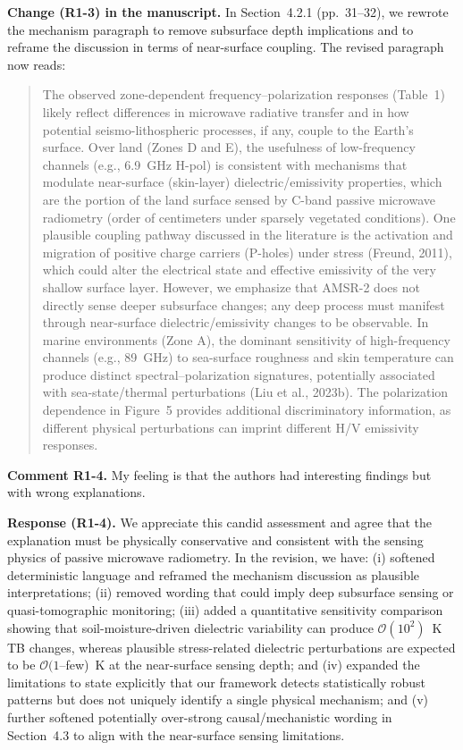 \documentclass[11pt]{article}
\newcommand{\revcomment}[1]{\begingroup\color{commentcolor}#1\endgroup}
\newcommand{\revresponse}[1]{\begingroup\color{responsecolor}#1\endgroup}
\newcommand{\revchange}[1]{\begingroup\color{changecolor}#1\endgroup}
\begin{document}
\revchange{%
\textbf{Change (R1-3) in the manuscript.}
In Section~4.2.1 (pp.~31--32), we rewrote the mechanism paragraph to remove subsurface depth implications and to reframe the discussion in terms of near-surface coupling. The revised paragraph now reads:
\begin{quote}
The observed zone-dependent frequency--polarization responses (Table~1) likely reflect differences in microwave radiative transfer and in how potential seismo-lithospheric processes, if any, couple to the Earth's surface. Over land (Zones D and E), the usefulness of low-frequency channels (e.g., 6.9~GHz H-pol) is consistent with mechanisms that modulate near-surface (skin-layer) dielectric/emissivity properties, which are the portion of the land surface sensed by C-band passive microwave radiometry (order of centimeters under sparsely vegetated conditions). One plausible coupling pathway discussed in the literature is the activation and migration of positive charge carriers (P-holes) under stress (Freund, 2011), which could alter the electrical state and effective emissivity of the very shallow surface layer. However, we emphasize that AMSR-2 does not directly sense deeper subsurface changes; any deep process must manifest through near-surface dielectric/emissivity changes to be observable. In marine environments (Zone A), the dominant sensitivity of high-frequency channels (e.g., 89~GHz) to sea-surface roughness and skin temperature can produce distinct spectral--polarization signatures, potentially associated with sea-state/thermal perturbations (Liu et al., 2023b). The polarization dependence in Figure~5 provides additional discriminatory information, as different physical perturbations can imprint different H/V emissivity responses.
\end{quote}
}

\bigskip

\revcomment{%
\textbf{Comment R1-4.}
My feeling is that the authors had interesting findings but with wrong explanations.
}

\revresponse{%
\textbf{Response (R1-4).}
We appreciate this candid assessment and agree that the explanation must be physically conservative and consistent with the sensing physics of passive microwave radiometry. In the revision, we have:
(i) softened deterministic language and reframed the mechanism discussion as plausible interpretations;
(ii) removed wording that could imply deep subsurface sensing or quasi-tomographic monitoring;
(iii) added a quantitative sensitivity comparison showing that soil-moisture-driven dielectric variability can produce $\mathcal{O}(10^2)$~K TB changes, whereas plausible stress-related dielectric perturbations are expected to be $\mathcal{O}(1$--few)~K at the near-surface sensing depth; and
(iv) expanded the limitations to state explicitly that our framework detects statistically robust patterns but does not uniquely identify a single physical mechanism; and
(v) further softened potentially over-strong causal/mechanistic wording in Section~4.3 to align with the near-surface sensing limitations.
}
\end{document}
